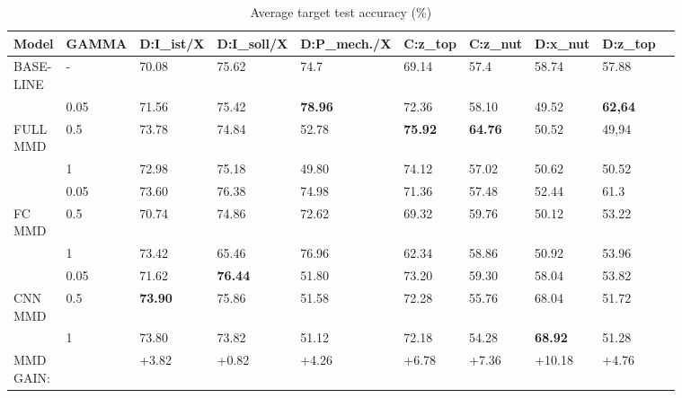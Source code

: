 \begin{sidewaystable}
\centering
\begin{tabular}{llllllllll}
  \toprule
  Model          & GAMMA    & D:I\_ist/X & D:I\_soll/X & D:P\_mech./X & C:z\_top & C:z\_nut & D:x\_nut & D:z\_top \\
  \midrule
  
  \vspace{1cm}
  
    \thead{BASE- \\ LINE}  & -      & 70.08 & 75.62 & 74.7 & 69.14 & 57.4 & 58.74 & 57.88\\


 
                            & 0.05   & 71.56 & 75.42 & \textbf{78.96} & 72.36 & 58.10 & 49.52 & \textbf{62,64}\\
    \thead{FULL \\ MMD}     & 0.5    & 73.78 & 74.84 & 52.78 & \textbf{75.92} & \textbf{64.76} & 50.52 & 49,94\\
    
    \vspace{1cm}
    
                            & 1      & 72.98 & 75.18 & 49.80 & 74.12 & 57.02 & 50.62 & 50.52\\


                            & 0.05   & 73.60 & 76.38 & 74.98 & 71.36 & 57.48 & 52.44 & 61.3\\
    \thead{FC \\ MMD}       & 0.5    & 70.74 & 74.86 & 72.62 & 69.32 & 59.76 & 50.12 & 53.22\\
    
    \vspace{1cm}
    
                            & 1      & 73.42 & 65.46 & 76.96 & 62.34 & 58.86 & 50.92 & 53.96\\

                            & 0.05   & 71.62 & \textbf{76.44} & 51.80 & 73.20 & 59.30 & 58.04 & 53.82\\
    \thead{CNN \\ MMD}      & 0.5    & \textbf{73.90} & 75.86 & 51.58 & 72.28 & 55.76 & 68.04 & 51.72\\
                            & 1      & 73.80 & 73.82 & 51.12 & 72.18 & 54.28 & \textbf{68.92} & 51.28\\
 \addlinespace
 \hline
 \thead{MMD\\GAIN:} &  & +3.82 & +0.82 & +4.26 & +6.78 & +7.36 & +10.18 & +4.76\\
 
  \bottomrule
\end{tabular}
\caption{Average target test accuracy (\%)} \label{tab:Mean_Accuracy} 
\end{sidewaystable}

